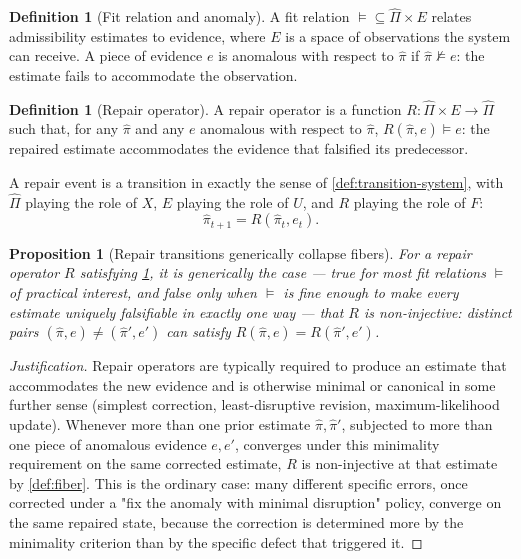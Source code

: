 \documentclass[11pt]{book}
\theoremstyle{plain}
\newtheorem{proposition}[theorem]{Proposition}
\theoremstyle{definition}
\newtheorem{definition}[theorem]{Definition}
\theoremstyle{remark}
\begin{document}
\begin{definition}[Fit relation and anomaly]
\label{def:fit}
A fit relation $\vDash \subseteq \hat\Pi \times E$ relates
admissibility estimates to evidence, where $E$ is a space of
observations the system can receive. A piece of evidence $e$ is
anomalous with respect to $\hat\pi$ if $\hat\pi \not\vDash e$: the
estimate fails to accommodate the observation.
\end{definition}

\begin{definition}[Repair operator]
\label{def:repair}
A repair operator is a function $R : \hat\Pi \times E \to \hat\Pi$
such that, for any $\hat\pi$ and any $e$ anomalous with respect to
$\hat\pi$, $R(\hat\pi, e) \vDash e$: the repaired estimate
accommodates the evidence that falsified its predecessor.
\end{definition}

A repair event is a transition in exactly the sense of
\cref{def:transition-system}, with $\hat\Pi$ playing the role of $X$, $E$
playing the role of $U$, and $R$ playing the role of $F$:
\[
\hat\pi_{t+1} = R(\hat\pi_t, e_t).
\]

\begin{proposition}[Repair transitions generically collapse fibers]
\label{prop:repair-collapse}
For a repair operator $R$ satisfying \cref{def:repair}, it is
generically the case --- true for most fit relations $\vDash$ of
practical interest, and false only when $\vDash$ is fine enough to
make every estimate uniquely falsifiable in exactly one way --- that
$R$ is non-injective: distinct pairs $(\hat\pi, e) \neq (\hat\pi', e')$
can satisfy $R(\hat\pi, e) = R(\hat\pi', e')$.
\end{proposition}

\begin{proof}[Justification]
Repair operators are typically required to produce an estimate that
accommodates the new evidence and is otherwise minimal or canonical
in some further sense (simplest correction, least-disruptive revision,
maximum-likelihood update). Whenever more than one prior estimate
$\hat\pi, \hat\pi'$, subjected to more than one piece of anomalous
evidence $e, e'$, converges under this minimality requirement on the
same corrected estimate, $R$ is non-injective at that estimate by
\cref{def:fiber}. This is the ordinary case: many different specific
errors, once corrected under a "fix the anomaly with minimal
disruption" policy, converge on the same repaired state, because the
correction is determined more by the minimality criterion than by the
specific defect that triggered it.
\end{proof}
\end{document}
